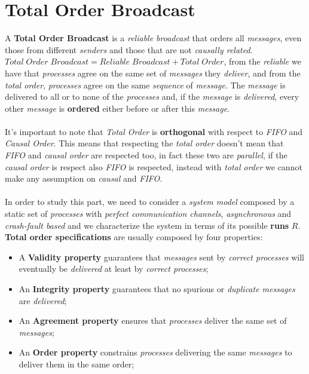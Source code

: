 \documentclass{article}
\begin{document}
\section{Total Order Broadcast}
A \textbf{Total Order Broadcast} is a \emph{reliable broadcast} that orders all \emph{messages}, even those from different \emph{senders} and those that are not \emph{causally related}. $Total\; Order\; Broadcast = Reliable\; Broadcast + Total\; Order$, from the \emph{reliable} we have that \emph{processes} agree on the same set of \emph{messages} they \emph{deliver}, and from the\emph{ total order}, \emph{processes} agree on the same \emph{sequence} of \emph{message}. The \emph{message} is delivered to all or to none of the \emph{processes} and, if the \emph{message} is \emph{delivered}, every other \emph{message} is \textbf{ordered} either before or after this \emph{message}. 
\\\\
It's important to note that \emph{Total Order} is \textbf{orthogonal} with respect to \emph{FIFO} and \emph{Causal Order}. This means that respecting the \emph{total order} doesn't mean that \emph{FIFO} and \emph{causal order} are respected too, in fact these two are \emph{parallel}, if the \emph{causal order} is respect also \emph{FIFO} is respected, instead with \emph{total order} we cannot make any assumption on \emph{causal} and \emph{FIFO}.\\\\
In order to study this part, we need to consider a \emph{system model} composed by a static set of \emph{processes} with \emph{perfect communication channels}, \emph{asynchronous} and \emph{crash-fault based} and we characterize the system in terms of its possible \textbf{runs} $R$.\textbf{ Total order specifications} are usually composed by four properties:
\begin{itemize}
\item A \textbf{Validity property} guarantees that \emph{messages} sent by \emph{correct processes} will eventually be \emph{delivered} at least by \emph{correct processes};
\item An \textbf{Integrity property} guarantees that no spurious or \emph{duplicate messages} are \emph{delivered};
\item An \textbf{Agreement property} ensures that \emph{processes} deliver the same set of \emph{messages};
\item An \textbf{Order property} constrains \emph{processes} delivering the same \emph{messages} to deliver them in the same order;
\end{itemize}
\end{document}
